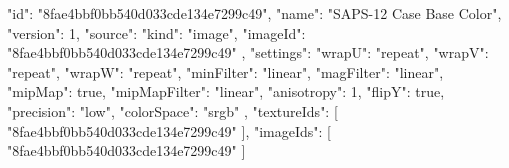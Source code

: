 {
  "id": "8fae4bbf0bb540d033cde134e7299c49",
  "name": "SAPS-12 Case Base Color",
  "version": 1,
  "source": {
    "kind": "image",
    "imageId": "8fae4bbf0bb540d033cde134e7299c49"
  },
  "settings": {
    "wrapU": "repeat",
    "wrapV": "repeat",
    "wrapW": "repeat",
    "minFilter": "linear",
    "magFilter": "linear",
    "mipMap": true,
    "mipMapFilter": "linear",
    "anisotropy": 1,
    "flipY": true,
    "precision": "low",
    "colorSpace": "srgb"
  },
  "textureIds": [
    "8fae4bbf0bb540d033cde134e7299c49"
  ],
  "imageIds": [
    "8fae4bbf0bb540d033cde134e7299c49"
  ]
}

